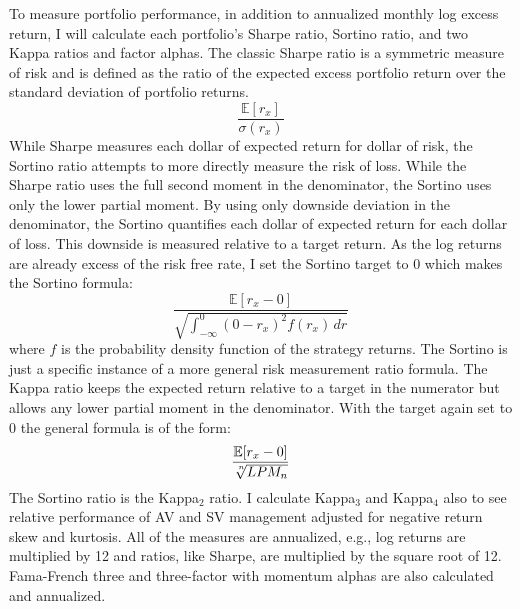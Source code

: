 To measure portfolio performance, in addition to annualized monthly log excess return, I will calculate each portfolio's Sharpe ratio, Sortino ratio, and two Kappa ratios and factor alphas. The classic Sharpe ratio is a symmetric measure of risk and is defined as the ratio of the expected excess portfolio return over the standard deviation of portfolio returns.
\begin{equation}
	\frac{\mathbb{E}[r_{x}]}{\sigma(r_{x})}
\end{equation}
While Sharpe measures each dollar of expected return for dollar of risk, the Sortino ratio attempts to more directly measure the risk of loss. While the Sharpe ratio uses the full second moment in the denominator, the Sortino uses only the lower partial moment. By using only downside deviation in the denominator, the Sortino quantifies each dollar of expected return for each dollar of loss. This downside is measured relative to a target return. \citep{sortino_performance_1994} As the log returns are already excess of the risk free rate, I set the Sortino target to 0 which makes the Sortino formula:
\begin{equation}
	\frac{\mathbb{E}[r_{x} - 0]}{\sqrt  {\int _{{-\infty }}^{0}(0-r_{x})^{2}f(r_{x})\,dr}}
\end{equation}
where $f$ is the probability density function of the strategy returns. The Sortino is just a specific instance of a more general risk measurement ratio formula. The Kappa ratio keeps the expected return relative to a target in the numerator but allows any lower partial moment in the denominator. \citep{kaplan_kappa:_2004} With the target again set to 0 the general formula is of the form:
\begin{equation}
\frac{\mathbb{E}[r_{x} - 0]}{\sqrt[\leftroot{-2}\uproot{2}n]{LPM_{n}}} 
\end{equation}
The Sortino ratio is the Kappa$_{2}$ ratio. I calculate Kappa$_{3}$ and Kappa$_{4}$ also to see relative performance of AV and SV management adjusted for negative return skew and kurtosis. All of the measures are annualized, e.g., log returns are multiplied by 12 and ratios, like Sharpe, are multiplied by the square root of 12. Fama-French three and three-factor with momentum alphas are also calculated and annualized. 

